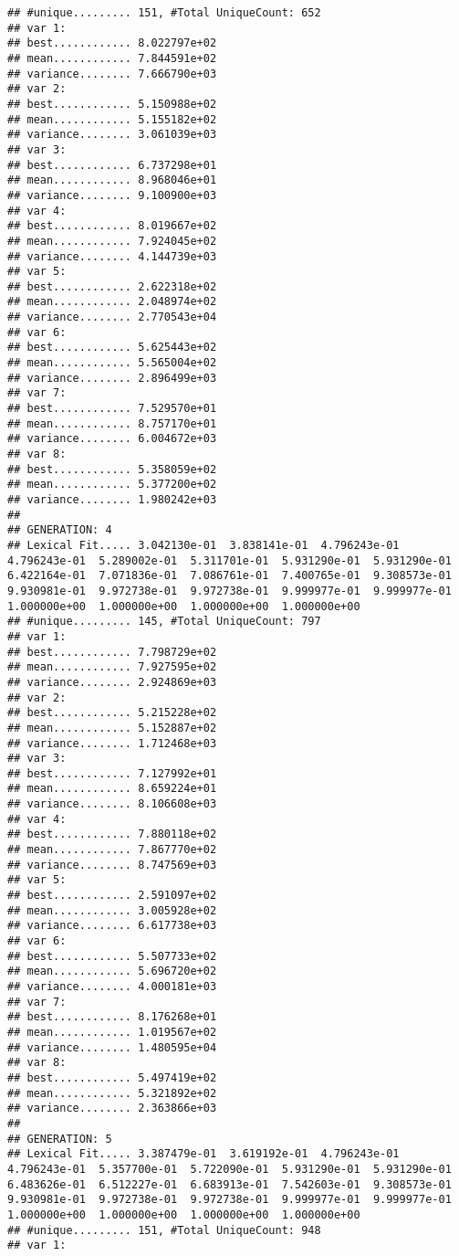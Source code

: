 \documentclass[]{article}
\begin{document}
\begin{verbatim}
## #unique......... 151, #Total UniqueCount: 652
## var 1:
## best............ 8.022797e+02
## mean............ 7.844591e+02
## variance........ 7.666790e+03
## var 2:
## best............ 5.150988e+02
## mean............ 5.155182e+02
## variance........ 3.061039e+03
## var 3:
## best............ 6.737298e+01
## mean............ 8.968046e+01
## variance........ 9.100900e+03
## var 4:
## best............ 8.019667e+02
## mean............ 7.924045e+02
## variance........ 4.144739e+03
## var 5:
## best............ 2.622318e+02
## mean............ 2.048974e+02
## variance........ 2.770543e+04
## var 6:
## best............ 5.625443e+02
## mean............ 5.565004e+02
## variance........ 2.896499e+03
## var 7:
## best............ 7.529570e+01
## mean............ 8.757170e+01
## variance........ 6.004672e+03
## var 8:
## best............ 5.358059e+02
## mean............ 5.377200e+02
## variance........ 1.980242e+03
## 
## GENERATION: 4
## Lexical Fit..... 3.042130e-01  3.838141e-01  4.796243e-01  4.796243e-01  5.289002e-01  5.311701e-01  5.931290e-01  5.931290e-01  6.422164e-01  7.071836e-01  7.086761e-01  7.400765e-01  9.308573e-01  9.930981e-01  9.972738e-01  9.972738e-01  9.999977e-01  9.999977e-01  1.000000e+00  1.000000e+00  1.000000e+00  1.000000e+00  
## #unique......... 145, #Total UniqueCount: 797
## var 1:
## best............ 7.798729e+02
## mean............ 7.927595e+02
## variance........ 2.924869e+03
## var 2:
## best............ 5.215228e+02
## mean............ 5.152887e+02
## variance........ 1.712468e+03
## var 3:
## best............ 7.127992e+01
## mean............ 8.659224e+01
## variance........ 8.106608e+03
## var 4:
## best............ 7.880118e+02
## mean............ 7.867770e+02
## variance........ 8.747569e+03
## var 5:
## best............ 2.591097e+02
## mean............ 3.005928e+02
## variance........ 6.617738e+03
## var 6:
## best............ 5.507733e+02
## mean............ 5.696720e+02
## variance........ 4.000181e+03
## var 7:
## best............ 8.176268e+01
## mean............ 1.019567e+02
## variance........ 1.480595e+04
## var 8:
## best............ 5.497419e+02
## mean............ 5.321892e+02
## variance........ 2.363866e+03
## 
## GENERATION: 5
## Lexical Fit..... 3.387479e-01  3.619192e-01  4.796243e-01  4.796243e-01  5.357700e-01  5.722090e-01  5.931290e-01  5.931290e-01  6.483626e-01  6.512227e-01  6.683913e-01  7.542603e-01  9.308573e-01  9.930981e-01  9.972738e-01  9.972738e-01  9.999977e-01  9.999977e-01  1.000000e+00  1.000000e+00  1.000000e+00  1.000000e+00  
## #unique......... 151, #Total UniqueCount: 948
## var 1:

\end{verbatim}
\end{document}
